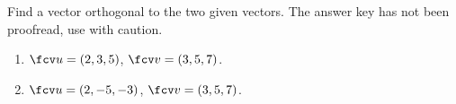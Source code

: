 Find a vector orthogonal to the two given vectors. The answer key has not been proofread, use with caution.

\begin{enumerate}
\item $\fcv u=( 2,3,5)$, $\fcv v=( 3,5,7 )$.
\item $\fcv u=( 2,-5,-3)$, $\fcv v=( 3,5,7 )$.

\end{enumerate}
